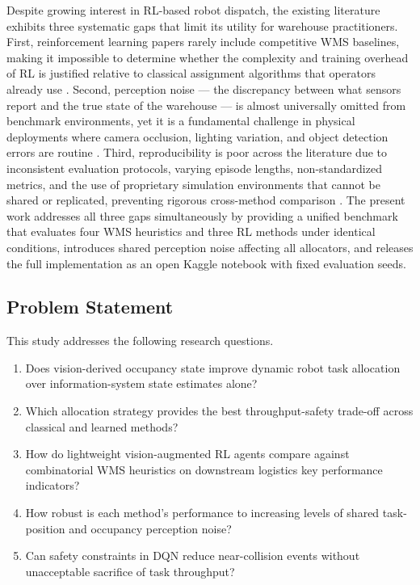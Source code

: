 \documentclass[conference]{IEEEtran}
\begin{document}
Despite growing interest in RL-based robot dispatch, the existing literature exhibits three systematic gaps that limit its utility for warehouse practitioners.
First, reinforcement learning papers rarely include competitive WMS baselines, making it impossible to determine whether the complexity and training overhead of RL is justified relative to classical assignment algorithms that operators already use \cite{boysen2019warehousing}.
Second, perception noise --- the discrepancy between what sensors report and the true state of the warehouse --- is almost universally omitted from benchmark environments, yet it is a fundamental challenge in physical deployments where camera occlusion, lighting variation, and object detection errors are routine \cite{fragapane2021planning}.
Third, reproducibility is poor across the literature due to inconsistent evaluation protocols, varying episode lengths, non-standardized metrics, and the use of proprietary simulation environments that cannot be shared or replicated, preventing rigorous cross-method comparison \cite{gu2017deep}.
The present work addresses all three gaps simultaneously by providing a unified benchmark that evaluates four WMS heuristics and three RL methods under identical conditions, introduces shared perception noise affecting all allocators, and releases the full implementation as an open Kaggle notebook with fixed evaluation seeds.

\subsection{Problem Statement}

This study addresses the following research questions.

\begin{enumerate}
    \item Does vision-derived occupancy state improve dynamic robot task allocation over information-system state estimates alone?
    \item Which allocation strategy provides the best throughput-safety trade-off across classical and learned methods?
    \item How do lightweight vision-augmented RL agents compare against combinatorial WMS heuristics on downstream logistics key performance indicators?
    \item How robust is each method's performance to increasing levels of shared task-position and occupancy perception noise?
    \item Can safety constraints in DQN reduce near-collision events without unacceptable sacrifice of task throughput?
\end{enumerate}
\end{document}
